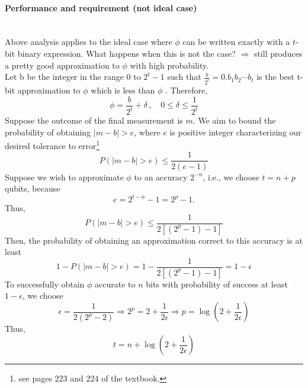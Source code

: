 \documentclass[]{book}
\theoremstyle{nonumberplain}
\begin{document}
\paragraph{Performance and requirement (not ideal case)}\\
Above analysis applies to the ideal case where $\phi$ can be written exactly with a $t$-bit binary expression. What happens when this is not the case? $\Rightarrow$ still produces a pretty good approximation to $\phi$ with high probability. \\
Let b be the integer in the range 0 to $2^{t}-1$ such that $\frac{b}{2^{t}} = 0.b_{1}b_{2}\cdots b_{t}$ is the best t-bit approximation to $\phi$ which is less than $\phi$ . Therefore, 
\[
        \phi = \frac{b}{2^t}+\delta\, , \quad 0\leq \delta\leq\frac{1}{2^t}
\]
Suppose the outcome of the final measurement is $m$. We aim to bound the probability of obtaining $|m-b|>e$, where $e$ is positive integer characterizing our desired tolerance to error\footnote{see pages 223 and 224 of the textbook. }
\[
	P(|m-b|>e) \leq \frac{1}{2(e-1)}
\] 
Suppose we wish to approximate $\phi$ to an accuracy $2^{-n}$, i.e., we choose $t=n+p$ qubits, because
\[
e = 2^{t-n} -1  = 2^{p} -1 .
\] 
Thus,
\[
	P(|m-b|>e) \leq \frac{1}{2[(2^{p}-1)-1]}
\] 
Then, the probability of obtaining an approximation correct to this accuracy is at least
\[
	1-P(|m-b|>e) = 1-\frac{1}{2[(2^{p}-1)-1]} = 1-\epsilon
\] 
To successfully obtain $\phi$ accurate to $n$ bits with probability of success at least $1-\epsilon$, we choose
\[
	\epsilon = \frac{1}{2(2^{p}-2)} \Rightarrow 2^{p} = 2+\frac{1}{2\epsilon} \Rightarrow p = \log{\left(2+\frac{1}{2\epsilon}\right)}
\] 
Thus,
\[
	t=n+\log{\left(2+\frac{1}{2\epsilon}\right)}
\] 
\end{document}
